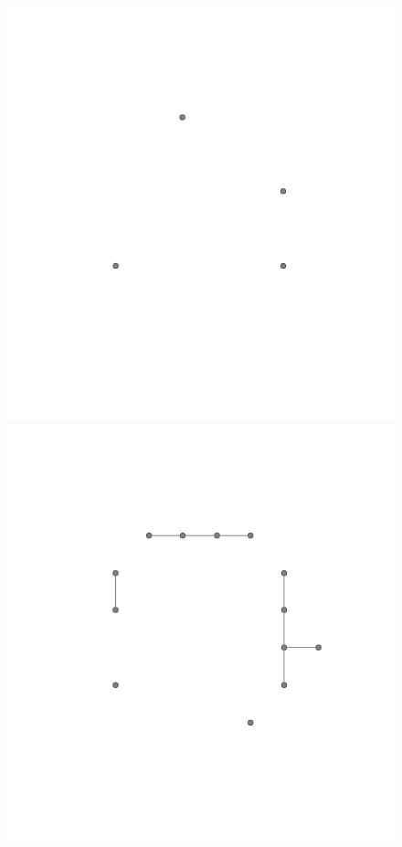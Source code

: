 \documentclass[12pt,a4paper,twoside]{article} %
\theoremstyle{plain}
\theoremstyle{definition}
\begin{document}
\begin{figure}[h!]
\centering
\includegraphics[scale=0.33]{img/f1.png}
\includegraphics[scale=0.33]{img/f2.png}

\end{figure}
\end{document}
